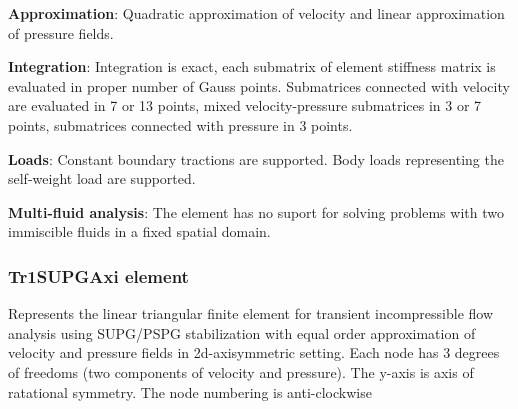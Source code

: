 \documentclass[a4paper]{article}
\newcommand{\descitem}[1]{{\noindent \bf #1}:}
\begin{document}
\descitem{Approximation} Quadratic approximation of velocity and linear approximation of pressure fields.

\descitem{Integration}
Integration is exact, each submatrix of element stiffness matrix is evaluated in proper number of
Gauss points. Submatrices connected with velocity are evaluated in 7 or 13 points, mixed velocity-pressure
submatrices in 3 or 7 points, submatrices connected with pressure in 3 points.

\descitem{Loads} Constant boundary tractions are supported. Body loads
representing the self-weight load are supported.

\descitem{Multi-fluid analysis} The element has no suport for solving
problems with two immiscible fluids in a fixed spatial domain.

\subsubsection{Tr1SUPGAxi element}
\label{Tr1SUPGAxi}
Represents the linear triangular finite element for transient
incompressible flow analysis using SUPG/PSPG stabilization with equal order
approximation of velocity and pressure fields in 2d-axisymmetric setting. Each node has 3 degrees
of freedoms (two components of velocity and pressure). The y-axis is
axis of ratational symmetry. The node numbering is anti-clockwise
\end{document}
